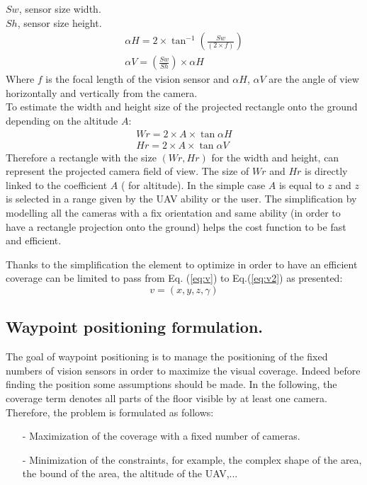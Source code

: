 \noindent $Sw$, sensor size width. \\
$Sh$, sensor size height.
\begin{equation} 
  \begin{split}
	\alpha H = 2\times \tan^{-1} (\frac{Sw}{(2\times f)}  ) 
    \\
	\alpha V = (\frac{Sw}{Sh} )\times \alpha H
  \end{split}
\end{equation}
Where $f$ is the focal length of the vision sensor and 
$\alpha H$, $\alpha V$ are the angle of view horizontally and vertically from the camera.\\
To estimate the width and height size of the projected rectangle onto the ground depending on the altitude $A$:
\begin{equation}\label{eq:WrHr}
	\begin{split}
    	Wr= 2\times A\times\tan \alpha H
        \\
        Hr= 2\times A\times\tan \alpha V
     \end{split}
\end{equation} 
Therefore a rectangle with the size $(Wr, Hr)$ for the width and height, can represent the projected  camera field of view. The size of $Wr$ and $Hr$ is directly linked to the coefficient $A$ ( for altitude). In the simple case $A $ is equal to  $z$ and $z$ is selected in a range given by the UAV ability or the user. The simplification by modelling all the cameras with a fix orientation and same ability (in order to have a rectangle projection onto the ground) helps the cost function to be fast and efficient. 

Thanks to the simplification the element to optimize in order to have an efficient coverage can be limited to pass from Eq. (\ref{eq:v}) to  Eq.(\ref{eq:v2})  as presented: 
\begin{equation}\label{eq:v2}
v=(x,y,z,\gamma )
\end{equation}

\subsection{ Waypoint positioning formulation. }\label{WaypointPositiongForm}

The goal of waypoint positioning is to manage the positioning of the fixed numbers of vision sensors in order to maximize the visual coverage. Indeed before finding the position some assumptions should be made.
In the following, the coverage term denotes all parts of the floor visible by at least one camera. 
 Therefore, the problem is formulated as follows:
\begin{itemize}
\item [-] Maximization of the coverage with a fixed number of cameras.
\item [-] Minimization of the constraints, for example, the complex shape of the area, the bound of the area, the altitude of the UAV,...
\end{itemize}

